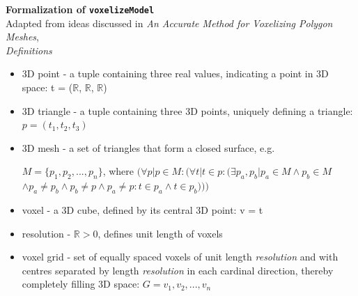 \documentclass[12pt, titlepage]{article}
\begin{document}
\noindent \textbf{Formalization of \texttt{voxelizeModel}}\\
Adapted from ideas discussed in \textit{An Accurate Method for Voxelizing Polygon Meshes}, \cite{HuangAndYagelAndFilippovAndKurzion1998}\\
\textit{Definitions}
\begin{itemize}
  \item 3D point - a tuple containing three real values, indicating a point in 3D space: t = ($\mathbb{R}$, $\mathbb{R}$, $\mathbb{R}$)
  \item 3D triangle - a tuple containing three 3D points, uniquely defining a triangle: $p = (t_1, t_2, t_3)$
  \item 3D mesh - a set of triangles that form a closed surface, e.g.
  \begin{center}
  $M = \{p_1, p_2, ..., p_n\}$, where
  $(\forall p | p \in M: (\forall t | t \in p: (\exists p_a, p_b | p_a \in M \land p_b \in M$ 
  $\land p_a \neq p_b \land p_b \neq p \land p_a \neq p: t \in p_a \land t \in p_b)))$
  \end{center}
  \item voxel - a 3D cube, defined by its central 3D point: v = t
  \item resolution - $\mathbb{R} > 0$, defines unit length of voxels
  \item voxel grid - set of equally spaced voxels of unit length \textit{resolution} and with centres separated by length \textit{resolution} in each cardinal direction,  thereby completely filling 3D space: $G = {v_1, v_2, ..., v_n}$
\end{itemize}
\end{document}
